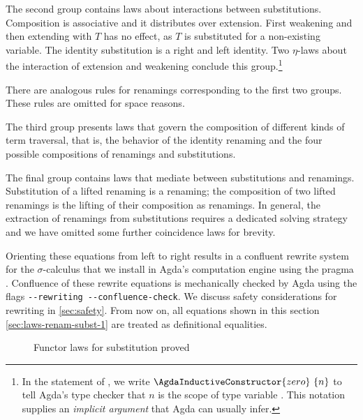 \documentclass[manuscript,screen,review,anonymous,acmsmall]{acmart}
\begin{document}
The second group contains laws about interactions between substitutions.
\SFTypeSubstitutionInteraction
Composition is associative and it distributes over extension. First weakening and then
extending with $T$ has no effect, as $T$ is substituted for a non-existing variable. The
identity substitution is a right and left identity. Two 
$\eta$-laws about the interaction of extension and
weakening conclude this group.\footnote{In the statement of , we
  write $\AgdaInductiveConstructor{zero}~ \{n\}$ to tell Agda's type
  checker that $n$ is the scope of type variable
  . This notation supplies an
  \emph{implicit argument} that Agda can usually infer.}

There are analogous rules for renamings corresponding to the first two
groups. These rules are omitted for space reasons. 

The third group presents laws that govern the composition of different
kinds of term traversal, that is, the behavior of the identity
renaming and the four possible compositions of renamings and
substitutions.
\SFTypeMonad

The final group contains laws that mediate
between substitutions and renamings. Substitution of a
lifted renaming is a renaming; the composition of two
lifted renamings is the lifting of their composition as renamings.
\SFTypeCoincidence
In general, the extraction of renamings from
substitutions requires a dedicated solving
strategy~\cite{10.1145/3293880.3294101} and we have omitted some
further coincidence laws for brevity.

Orienting these equations from left to right results in a confluent
rewrite system for the $\sigma$-calculus that we install in Agda's computation engine using the
 pragma \cite{cockx:LIPIcs.TYPES.2019.2}. Confluence of
these rewrite equations is mechanically checked by Agda using
the flags \texttt{-{}-rewriting -{}-confluence-check}. We discuss safety considerations for
rewriting in \cref{sec:safety}. From now on, all 
equations shown in this section \cref{sec:laws-renam-subst-1} are
treated as definitional equalities.

\begin{figure}[t]
\noindent\begin{minipage}[t]{0.49\linewidth}
  \SFTypeSubFunctorialLift
\end{minipage}\hfill\begin{minipage}[t]{0.49\linewidth}
  \SFTypeSubFunctorialApply
\end{minipage}
  \caption{Functor laws for substitution proved}
  \label{fig:functor-laws-substitution}
\end{figure}
\end{document}
